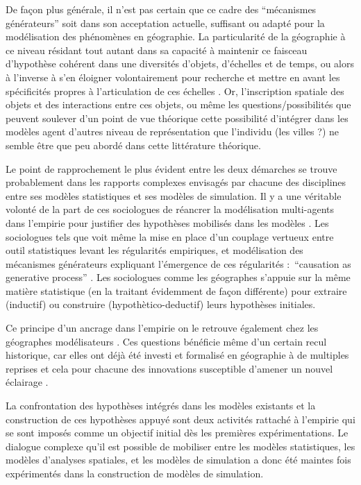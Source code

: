 De façon plus générale, il n'est pas certain que ce cadre des \enquote{mécanismes générateurs} soit dans son acceptation actuelle, suffisant ou adapté pour la modélisation des phénomènes en géographie. La particularité de la géographie à ce niveau résidant tout autant dans sa capacité à maintenir ce faisceau d'hypothèse cohérent dans une diversités d'objets, d'échelles et de temps, ou alors à l'inverse à s'en éloigner volontairement pour recherche et mettre en avant les spécificités propres à l'articulation de ces échelles \autocite{Sanders2001}. Or, l'inscription spatiale des objets et des interactions entre ces objets, ou même les questions/possibilités que peuvent soulever d'un point de vue théorique cette possibilité d'intégrer dans les modèles agent d'autres niveau de représentation que l'individu (les villes \autocite{Sanders2006} ?) ne semble être que peu abordé dans cette littérature théorique.
 
Le point de rapprochement le plus évident entre les deux démarches se trouve probablement dans les rapports complexes envisagés par chacune des disciplines entre ses modèles statistiques et ses modèles de simulation. Il y a une véritable volonté de la part de ces sociologues de réancrer  la modélisation multi-agents dans l'empirie pour justifier des hypothèses mobilisés dans les modèles \autocites{Manzo2005}[23]{Manzo2007}{Hedstrom2015}. Les sociologues tels que \textcite{Goldthorpe2001} voit même la mise en place d'un couplage vertueux entre outil statistiques levant les régularités empiriques, et modélisation des mécanismes générateurs expliquant l'émergence de ces régularités : \foreignquote{english}{causation as generative process} \autocite[50]{Manzo2005}. Les sociologues comme les géographes s'appuie sur la même matière statistique (en la traitant évidemment de façon différente) pour extraire (inductif) ou construire (hypothètico-deductif) leurs hypothèses initiales. 

Ce principe d'un ancrage dans l'empirie on le retrouve également chez les géographes modélisateurs \autocite{Banos2013}. Ces questions bénéficie même d'un certain recul historique, car elles ont déjà été investi et formalisé en géographie à de multiples reprises et cela pour chacune des innovations susceptible d'amener un nouvel éclairage \autocite{Sanders2000, Mathian2014}.

La confrontation des hypothèses intégrés dans les modèles existants \autocite{Pumain1983, Sanders1984} et la construction de ces hypothèses appuyé  \autocite{AMORAL1983} sont deux activités rattaché à l'empirie qui se sont imposés comme un objectif initial dès les premières expérimentations. Le dialogue complexe qu'il est possible de mobiliser entre les modèles statistiques, les modèles d'analyses spatiales, et les modèles de simulation a donc été maintes fois expérimentés dans la construction de modèles de simulation.

